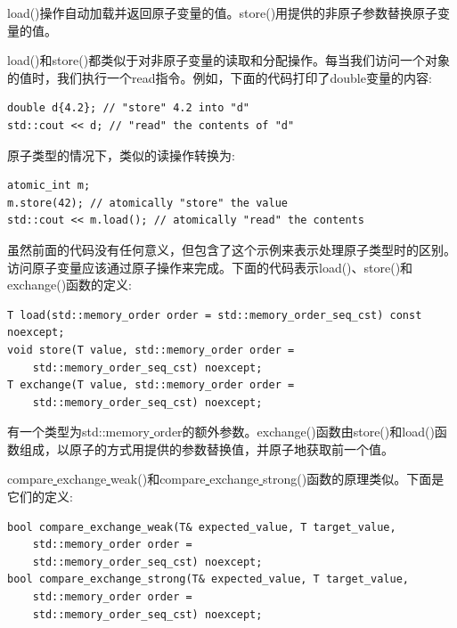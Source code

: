 load()操作自动加载并返回原子变量的值。store()用提供的非原子参数替换原子变量的值。 \par
load()和store()都类似于对非原子变量的读取和分配操作。每当我们访问一个对象的值时，我们执行一个read指令。例如，下面的代码打印了double变量的内容: \par

\begin{lstlisting}[caption={}]
double d{4.2}; // "store" 4.2 into "d"
std::cout << d; // "read" the contents of "d"
\end{lstlisting}

原子类型的情况下，类似的读操作转换为: \par

\begin{lstlisting}[caption={}]
atomic_int m;
m.store(42); // atomically "store" the value
std::cout << m.load(); // atomically "read" the contents
\end{lstlisting}

虽然前面的代码没有任何意义，但包含了这个示例来表示处理原子类型时的区别。访问原子变量应该通过原子操作来完成。下面的代码表示load()、store()和exchange()函数的定义: \par

\begin{lstlisting}[caption={}]
T load(std::memory_order order = std::memory_order_seq_cst) const noexcept;
void store(T value, std::memory_order order =
	std::memory_order_seq_cst) noexcept;
T exchange(T value, std::memory_order order =
	std::memory_order_seq_cst) noexcept;
\end{lstlisting}

有一个类型为std::memory\underline{ }order的额外参数。exchange()函数由store()和load()函数组成，以原子的方式用提供的参数替换值，并原子地获取前一个值。 \par
compare\underline{ }exchange\underline{ }weak()和compare\underline{ }exchange\underline{ }strong()函数的原理类似。下面是它们的定义: \par

\begin{lstlisting}[caption={}]
bool compare_exchange_weak(T& expected_value, T target_value,
	std::memory_order order =
	std::memory_order_seq_cst) noexcept;
bool compare_exchange_strong(T& expected_value, T target_value,
	std::memory_order order =
	std::memory_order_seq_cst) noexcept;
\end{lstlisting}

